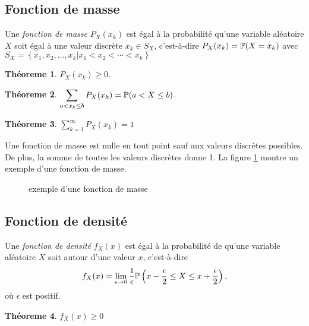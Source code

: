 \documentclass[11pt]{article}
\renewcommand\P{%
	\ensuremath{%
		\mathbb{P}%
	}%
}%
\newtheorem{theoreme}{Théoreme}[section]
\begin{document}
\subsection{Fonction de masse}
\begin{definition}
	Une \textit{fonction de masse} $P_X(x_k)$ est égal à la probabilité qu'une
	variable aléatoire $X$ soit égal à une valeur discrète $x_k\in S_X$,
	c'est-à-dire $P_X(x_k)=\P(X=x_k)$ avec
	$S_X=\left\{x_1,x_2,\dots,x_k|x_1<x_2<\cdots<x_k\right\}$
\end{definition}

\begin{theoreme}
	$P_X(x_k)\geq 0$.
\end{theoreme}

\begin{theoreme}
	$\displaystyle\sum_{a< x_k\leq b}P_X(x_k)=\P(a<X\leq b)$.
\end{theoreme}

\begin{theoreme}
	$\displaystyle\sum_{k=1}^\infty P_X(x_k)=1$
\end{theoreme}

Une fonction de masse est nulle en tout point sauf aux valeurs discrètes
possibles. De plus, la somme de toutes les valeurs discrètes donne 1. La figure
\ref{fig:fonction_masse} montre un exemple d'une fonction de masse.

\begin{figure}[H]
	\centering
	\caption{exemple d'une fonction de masse}
	
	\label{fig:fonction_masse}
\end{figure}

\subsection{Fonction de densité}
\begin{definition}
	Une \textit{fonction de densité} $f_X(x)$ est égal à la probabilité de
	qu'une variable aléatoire $X$ soit autour d'une valeur $x$,
	c'est-à-dire
	\begin{equation*}
		f_X(x)=\lim_{\epsilon\rightarrow 0}\frac{1}{\epsilon}
		\P\left(x-\frac{\epsilon}{2}\leq X\leq x+\frac{\epsilon}{2}\right),
	\end{equation*}
	où $\epsilon$ est positif.
\end{definition}

\begin{theoreme}
	$f_X(x)\geq 0$
\end{theoreme}
\end{document}
